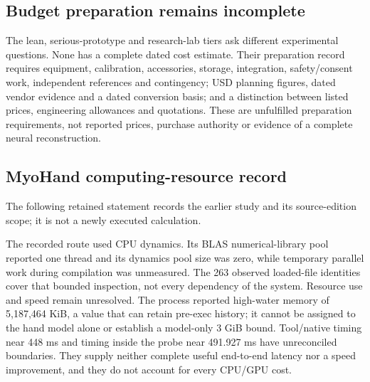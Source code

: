 \subsection{Budget preparation remains incomplete}
The lean, serious-prototype and research-lab tiers ask different experimental questions. None has a complete dated cost estimate. Their preparation record requires equipment, calibration, accessories, storage, integration, safety/consent work, independent references and contingency; USD planning figures, dated vendor evidence and a dated conversion basis; and a distinction between listed prices, engineering allowances and quotations. These are unfulfilled preparation requirements, not reported prices, purchase authority or evidence of a complete neural reconstruction.

\subsection{MyoHand computing-resource record}
The following retained statement records the earlier study and its source-edition scope; it is not a newly executed calculation.

The recorded route used CPU dynamics. Its BLAS numerical-library pool reported one thread and its dynamics pool size was zero, while temporary parallel work during compilation was unmeasured. The 263 observed loaded-file identities cover that bounded inspection, not every dependency of the system. Resource use and speed remain unresolved. The process reported high-water memory of 5,187,464 KiB, a value that can retain pre-exec history; it cannot be assigned to the hand model alone or establish a model-only 3 GiB bound. Tool/native timing near 448 ms and timing inside the probe near 491.927 ms have unreconciled boundaries. They supply neither complete useful end-to-end latency nor a speed improvement, and they do not account for every CPU/GPU cost.
